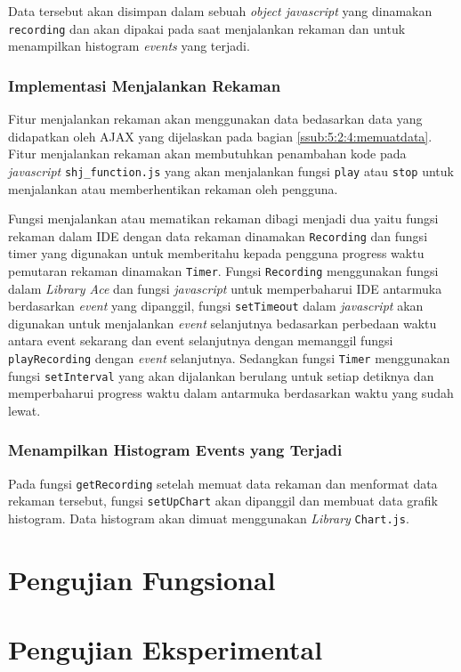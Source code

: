 Data tersebut akan disimpan dalam sebuah \textit{object javascript} yang dinamakan \verb|recording| dan akan dipakai pada saat menjalankan rekaman dan untuk menampilkan histogram \textit{events} yang terjadi.

\subsubsection{Implementasi Menjalankan Rekaman}
 
Fitur menjalankan rekaman akan menggunakan data bedasarkan data yang didapatkan oleh AJAX yang dijelaskan pada bagian \ref{ssub:5:2:4:memuatdata}. Fitur menjalankan rekaman akan membutuhkan penambahan kode pada \textit{javascript} \verb|shj_function.js| yang akan menjalankan fungsi \verb|play| atau \verb|stop| untuk menjalankan atau memberhentikan rekaman oleh pengguna. 

Fungsi menjalankan atau mematikan rekaman dibagi menjadi dua yaitu fungsi rekaman dalam IDE dengan data rekaman dinamakan \verb|Recording| dan fungsi timer yang digunakan untuk memberitahu kepada pengguna progress waktu pemutaran rekaman dinamakan \verb|Timer|.
Fungsi \verb|Recording| menggunakan fungsi dalam \textit{Library Ace} dan fungsi \textit{javascript} untuk memperbaharui IDE antarmuka berdasarkan \textit{event} yang dipanggil, fungsi \verb|setTimeout| dalam \textit{javascript} akan digunakan untuk menjalankan \textit{event} selanjutnya bedasarkan perbedaan waktu antara event sekarang dan event selanjutnya dengan memanggil fungsi \verb|playRecording| dengan \textit{event} selanjutnya. Sedangkan fungsi \verb|Timer| menggunakan fungsi \verb|setInterval| yang akan dijalankan berulang untuk setiap detiknya dan memperbaharui progress waktu dalam antarmuka berdasarkan waktu yang sudah lewat.

\subsubsection{Menampilkan Histogram Events yang Terjadi}

Pada fungsi \verb|getRecording| setelah memuat data rekaman dan menformat data rekaman tersebut, fungsi \verb|setUpChart| akan dipanggil dan membuat data grafik histogram. Data histogram akan dimuat menggunakan \textit{Library} \verb|Chart.js|.


\section{Pengujian Fungsional}
\label{sec:5:fungsional}

\section{Pengujian Eksperimental}
\label{sec:5:eksperimental}